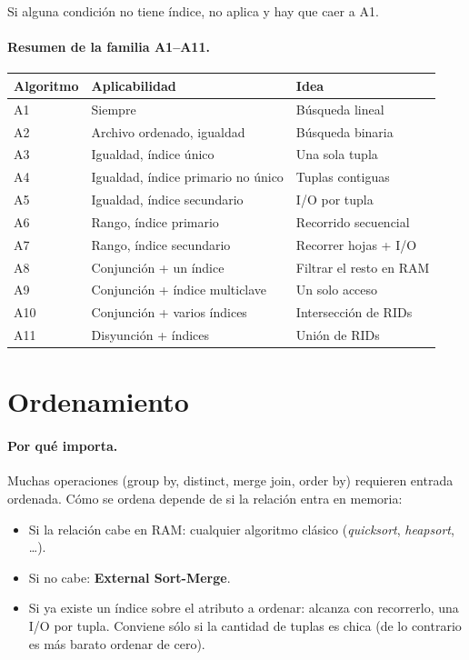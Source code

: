 \documentclass[11pt,a4paper]{article}
\begin{document}
Si alguna condición no tiene índice, no aplica y hay que caer a A1.

\paragraph{Resumen de la familia A1--A11.}

\begin{center}
\begin{tabular}{lll}
\toprule
Algoritmo & Aplicabilidad & Idea \\
\midrule
A1  & Siempre                            & Búsqueda lineal \\
A2  & Archivo ordenado, igualdad         & Búsqueda binaria \\
A3  & Igualdad, índice único             & Una sola tupla \\
A4  & Igualdad, índice primario no único & Tuplas contiguas \\
A5  & Igualdad, índice secundario        & I/O por tupla \\
A6  & Rango, índice primario             & Recorrido secuencial \\
A7  & Rango, índice secundario           & Recorrer hojas + I/O \\
A8  & Conjunción + un índice             & Filtrar el resto en RAM \\
A9  & Conjunción + índice multiclave     & Un solo acceso \\
A10 & Conjunción + varios índices        & Intersección de RIDs \\
A11 & Disyunción + índices               & Unión de RIDs \\
\bottomrule
\end{tabular}
\end{center}

\section{Ordenamiento}

\paragraph{Por qué importa.} Muchas operaciones (group by, distinct, merge
join, order by) requieren entrada ordenada. Cómo se ordena depende de si
la relación entra en memoria:

\begin{itemize}
    \item Si la relación cabe en RAM: cualquier algoritmo clásico
    (\emph{quicksort}, \emph{heapsort}, \ldots).
    \item Si no cabe: \textbf{External Sort-Merge}.
    \item Si ya existe un índice sobre el atributo a ordenar: alcanza con
    recorrerlo, una I/O por tupla. Conviene sólo si la cantidad de tuplas
    es chica (de lo contrario es más barato ordenar de cero).
\end{itemize}
\end{document}

